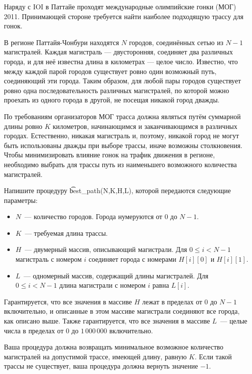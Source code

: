 Наряду с IOI в Паттайе проходят международные олимпийские гонки (МОГ) 2011. Принимающей стороне требуется найти наиболее подходящую трассу для гонок.

В регионе Паттайя-Чонбури находятся $N$ городов, соединённых сетью из $N-1$ магистралей. Каждая магистраль --- двусторонняя, соединяет два различных города, и для неё известна длина в километрах --- целое число. Известно, что между каждой парой городов существует ровно один возможный путь, соединяющий эти города. Таким образом, для любой пары городов существует ровно одна последовательность различных магистралей, по которой можно проехать из одного города в другой, не посещая никакой город дважды.

По требованиям организаторов МОГ трасса должна являться путём суммарной длины ровно $K$ километров, начинающимся и заканчивающимся в различных городах. Естественно, никакая магистраль и, поэтому, никакой город не могут быть использованы дважды при выборе трассы, иначе возможны столкновения. Чтобы минимизировать влияние гонок на трафик движения в регионе, необходимо выбрать для трассы путь из наименьшего возможного количества магистралей.

Напишите процедуру \t{best\_path(N,K,H,L)}, которой передаются следующие параметры:

\begin{itemize}
\item $N$~--- количество городов. Города нумеруются от $0$ до $N-1$. 
\item $K$~--- требуемая длина трассы. 
\item $H$~--- двумерный массив, описывающий магистрали. Для $0 \le i < N-1$ магистраль с номером $i$ соединяет города с номерами $H[i][0]$ и $H[i][1]$. 
\item $L$~--- одномерный массив, содержащий длины магистралей. Для $0 \le i < N-1$ длина магистрали с номером $i$ равна $L[i]$.
\end{itemize}

Гарантируется, что все значения в массиве $H$ лежат в пределах от $0$ до $N-1$ включительно, и описанные в этом массиве магистрали соединяют все города, как описано выше. Также гарантируется, что все значения в массиве $L$~--- целые числа в пределах от $0$ до $1\,000\,000$ включительно.

Ваша процедура должна возвращать минимальное возможное количество магистралей на допустимой трассе, имеющей длину, равную $K$. Если такой трассы не существует, ваша процедура должна вернуть значение $-1$.

